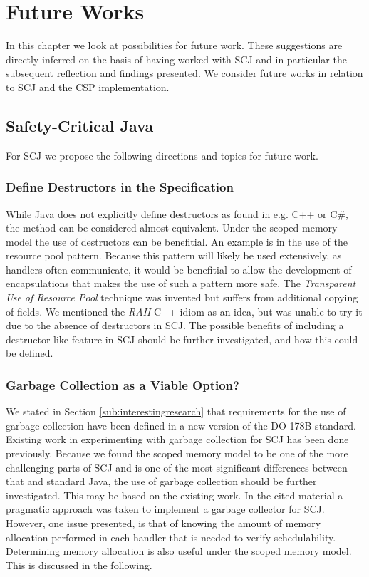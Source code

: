 \chapter{Future Works}
\label{chapter:FutureWorks}
In this chapter we look at possibilities for future work. These suggestions are directly inferred on the basis of having worked with SCJ and in particular the subsequent reflection and findings presented. We consider future works in relation to SCJ and the CSP implementation.

\section{Safety-Critical Java} %
\label{sec:scjfuture}
For SCJ we propose the following directions and topics for future work.

\subsection{Define Destructors in the Specification}
While Java does not explicitly define destructors as found in e.g. C++ or C\#, the  method can be considered almost equivalent. Under the scoped memory model the use of destructors can be benefitial. An example is in the use of the resource pool pattern. Because this pattern will likely be used extensively, as handlers often communicate, it would be benefitial to allow the development of encapsulations that makes the use of such a pattern more safe. The \textit{Transparent Use of Resource Pool} technique was invented but suffers from additional copying of fields. We mentioned the \textit{RAII} C++ idiom as an idea, but was unable to try it due to the absence of destructors in SCJ. The possible benefits of including a destructor-like feature in SCJ should be further investigated, and how this could be defined.

\subsection{Garbage Collection as a Viable Option?} %
\label{sub:garbage_collection_as_a_viable_option}
We stated in Section \ref{sub:interestingresearch} that requirements for the use of garbage collection have been defined in a new version of the DO-178B standard. Existing work in experimenting with garbage collection for SCJ has been done previously\cite{Schoeberl:2007:GCS:1288940.1288953}. Because we found the scoped memory model to be one of the more challenging parts of SCJ and is one of the most significant differences between that and standard Java, the use of garbage collection should be further investigated. This may be based on the existing work. In the cited material a pragmatic approach was taken to implement a garbage collector for SCJ. However, one issue presented, is that of knowing the amount of memory allocation performed in each handler that is needed to verify schedulability. Determining memory allocation is also useful under the scoped memory model. This is discussed in the following.

